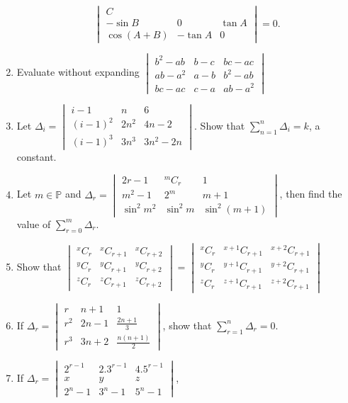 \begin{enumerate}[resume]
$$\begin{vmatrix}
  C\\-\sin B & 0 & \tan A\\\cos(A + B) & -\tan A & 0\end{vmatrix} = 0.$$
\item Evaluate without expanding $\begin{vmatrix}b^2 - ab & b - c & bc - ac\\ ab - a^2 & a - b & b^2 - ab\\ bc - ac & c - a & ab -
  a^2\end{vmatrix}$
\item Let $\Delta_i = \begin{vmatrix}i - 1 & n & 6\\(i - 1)^2 & 2n^2 & 4n - 2\\ (i - 1)^3 & 3n^3 & 3n^2 - 2n\end{vmatrix}$. Show
  that $\displaystyle\sum_{n = 1}^n\Delta_i = k$, a constant.
\item Let $m\in\mathbb{P}$ and $\Delta_r = \begin{vmatrix}2r - 1 & {}^mC_r & 1\\m^2 - 1 & 2^m & m + 1\\\sin^2m^2 & \sin^2m &
  \sin^2(m  + 1)\end{vmatrix}$, then find the value of $\displaystyle\sum_{r = 0}^m\Delta_r$.
\item Show that $\begin{vmatrix}{}^{x}C_r & {}^xC_{r + 1} & {}^xC_{r + 2}\\{}^{y}C_r & {}^yC_{r + 1} & {}^yC_{r + 2}\\{}^{z}C_r &
  {}^zC_{r + 1} & {}^zC_{r + 2}\end{vmatrix} = \begin{vmatrix}{}^{x}C_r & {}^{x + 1}C_{r + 1} &{}^{x + 2}C_{r + 1}\\{}^{y}C_r &
  {}^{y + 1}C_{r + 1} &{}^{y + 2}C_{r + 1}\\{}^{z}C_r & {}^{z + 1}C_{r + 1} &{}^{z + 2}C_{r + 1}\end{vmatrix}$
\item If $\Delta_r = \begin{vmatrix}r & n + 1& 1\\r^2 & 2n - 1 & \frac{2n + 1}{3}\\r^3 & 3n + 2 & \frac{n(n + 1)}{2}\end{vmatrix}$,
  show that $\displaystyle\sum_{r=1}^n\Delta_r = 0$.
\item If $\Delta_r = \begin{vmatrix}2^{r - 1} & 2.3^{r - 1} & 4.5^{r - 1}\\x & y & z\\2^{n} - 1 & 3^n - 1 & 5^n - 1\end{vmatrix}$,

\end{enumerate}
